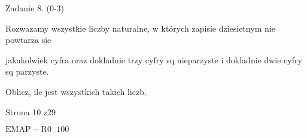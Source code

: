\documentclass[a4paper,12pt]{article}
\begin{document}
Zadanie 8. (0-3)

Rozwazamy wszystkie liczby naturalne, w których zapisie dziesietnym nie powtarza sie

jakakolwiek cyfra oraz dokladnie trzy cyfry sq nieparzyste i dokladnie dwie cyfry sq parzyste.

Oblicz, ile jest wszystkich takich liczb.

Strona 10 z29

$\mathrm{E}\mathrm{M}\mathrm{A}\mathrm{P}-\mathrm{R}0_{-}100$
\end{document}
